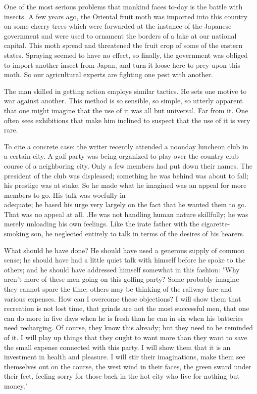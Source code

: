 \documentclass[10pt]{article}
\begin{document}
One of the most serious problems that mankind faces to-day is the battle with insects. A few years ago, the Oriental fruit moth was imported into this country on some cherry trees which were forwarded at the instance of the Japanese government and were used to ornament the borders of a lake at our national capital. This moth spread and threatened the fruit crop of some of the eastern states. Spraying seemed to have no effect, so finally, the government was obliged to import another insect from Japan, and turn it loose here to prey upon this moth. So our agricultural experts are fighting one pest with another.

The man skilled in getting action employs similar tactics. He sets one motive to war against another. This method is so sensible, so simple, so utterly apparent that one might imagine that the use of it was all but universal. Far from it. One often sees exhibitions that make him inclined to suspect that the use of it is very rare.

To cite a concrete case: the writer recently attended a noonday luncheon club in a certain city. A golf party was being organized to play over the country club course of a neighboring city. Only a few members had put down their names. The president of the club was displeased; something he was behind was about to fall; his prestige was at stake. So he made what he imagined was an appeal for more members to go. His talk was woefully in-\\
adequate; he based his urge very largely on the fact that he wanted them to go. That was no appeal at all. .He was not handling human nature skillfully; he was merely unloading his own feelings. Like the irate father with the cigarette-smoking son, he neglected entirely to talk in terms of the desires of his hearers.

What should he have done? He should have used a generous supply of common sense; he should have had a little quiet talk with himself before he spoke to the others; and he should have addressed himself somewhat in this fashion: "Why aren't more of these men going on this golfing party? Some probably imagine they cannot spare the time; others may be thinking of the railway fare and various expenses. How can I overcome these objections? I will show them that recreation is not lost time, that grinds are not the most successful men, that one can do more in five days when he is fresh than he can in six when his batteries need recharging. Of course, they know this already; but they need to be reminded of it. I will play up things that they ought to want more than they want to save the small expense connected with this party. I will show them that it is an investment in health and pleasure. I will stir their imaginations, make them see themselves out on the course, the west wind in their faces, the green sward under their feet, feeling sorry for those back in the hot city who live for nothing but money."
\end{document}

